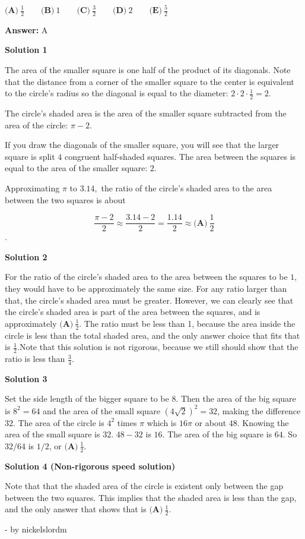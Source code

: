 \begin{enumerate}
$\textbf{(A)}\ \frac{1}2\qquad\textbf{(B)}\ 1\qquad\textbf{(C)}\ \frac{3}2\qquad\textbf{(D)}\ 2\qquad\textbf{(E)}\ \frac{5}2$

 \textbf{Answer: }A



\textbf{Solution 1}

The area of the smaller square is one half of the product of its diagonals. Note that the distance from a corner of the smaller square to the center is equivalent to the circle's radius so the diagonal is equal to the diameter: $2 \cdot  2 \cdot \frac{1}{2}=2.$

 The circle's shaded area is the area of the smaller square subtracted from the area of the circle: $\pi - 2.$

 If you draw the diagonals of the smaller square, you will see that the larger square is split $4$ congruent half-shaded squares. The area between the squares is equal to the area of the smaller square: $2.$

 Approximating $\pi$ to $3.14,$ the ratio of the circle's shaded area to the area between the two squares is about

 
 \[\frac{\pi-2}{2} \approx \frac{3.14-2}{2} = \frac{1.14}{2} \approx \boxed{\textbf{(A)}\ \frac12}\].

 



\textbf{Solution 2}

For the ratio of the circle's shaded area to the area between the squares to be $1,$ they would have to be approximately the same size. For any ratio larger than that, the circle's shaded area must be greater. However, we can clearly see that the circle's shaded area is part of the area between the squares, and is approximately $\boxed{\textbf{(A)}\ \frac12}$. The ratio must be less than 1, because the area inside the circle is less than the total shaded area, and the only answer choice that fits that is ${\frac12}$.Note that this solution is not rigorous, because we still should show that the ratio is less than $\frac{3}{4}$.

 



\textbf{Solution 3}

Set the side length of the bigger square to be $8$. Then the area of the big square is $8^2 =64$ and the area of the small square $(4\sqrt{2})^2  = 32$, making the difference $32$. The area of the circle is $4^2$ times $\pi$ which is $16 \pi$ or about $48$. Knowing the area of the small square is $32$. $48-32$ is $16$. The area of the big square is $64$. So $32/64$ is $1/2$, or $\boxed{\textbf{(A)}\ \frac12}$.

 



\textbf{Solution 4 (Non-rigorous speed solution)}

Note that that the shaded area of the circle is existent only between the gap between the two squares. This implies that the shaded area is less than the gap, and the only answer that shows that is $\boxed{\textbf{(A)}\ \frac{1}{2}}$.

 
- by nickelslordm

 


\end{enumerate}